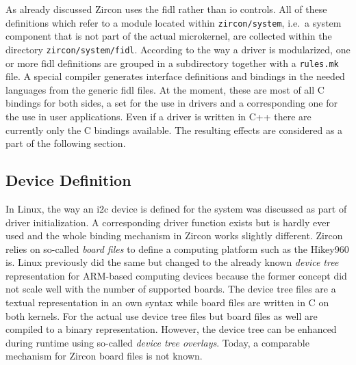 As already discussed Zircon uses the \acf{fidl} rather than \ac{io} controls.
All of these definitions which refer to a module located within \texttt{zircon/system}, i.e.\ a system component that is not part of the actual microkernel, are collected within the directory \texttt{zircon/system/fidl}.
According to the way a driver is modularized, one or more \ac{fidl} definitions are grouped in a subdirectory together with a \texttt{rules.mk} file.
A special compiler generates interface definitions and bindings in the needed languages from the generic \ac{fidl} files.
At the moment, these are most of all C bindings for both sides, a set for the use in drivers and a corresponding one for the use in user applications.
Even if a driver is written in C++ there are currently only the C bindings available.
The resulting effects are considered as a part of the following section.

\subsection{Device Definition}
In Linux, the way an \ac{i2c} device is defined for the system was discussed as part of driver initialization.
A corresponding driver function exists but is hardly ever used and the whole binding mechanism in Zircon works slightly different.
Zircon relies on so-called \textit{board files} to define a computing platform such as the Hikey960 is.
Linux previously did the same but changed to the already known \textit{device tree} representation for ARM-based computing devices because the former concept did not scale well with the number of supported boards.
The device tree files are a textual representation in an own syntax while board files are written in C on both kernels.
For the actual use device tree files but board files as well are compiled to a binary representation.
However, the device tree can be enhanced during runtime using so-called \textit{device tree overlays}.
Today, a comparable mechanism for Zircon board files is not known.

